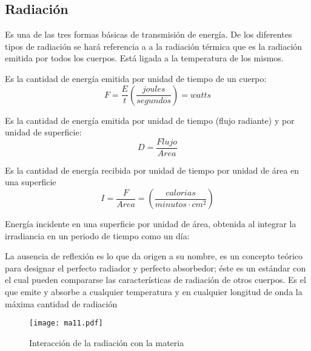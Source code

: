 \subsection{Radiación}
\begin{definition}
    Es una de las tres formas básicas de transmisión de energía. De los diferentes tipos de radiación se hará referencia a a la radiación térmica que es la radiación emitida por todos los cuerpos. Está ligada a la temperatura de los mismos.
\end{definition}
\begin{definition}
    Es la cantidad de energía emitida por unidad de tiempo de un cuerpo:
    \begin{equation}
        F = \frac{E}{t}\left(\frac{joules}{segundos}\right) = watts
    \end{equation}
\end{definition}
\begin{definition}
    Es la cantidad de energía emitida por unidad de tiempo (flujo radiante) y por unidad de superficie:
    \begin{equation}
        D = \frac{Flujo}{Area}
    \end{equation}
\end{definition}
\begin{definition}[Irradiancia]
    Es la cantidad de energía recibida por unidad de tiempo por unidad de área en una superficie
    \begin{equation}
        I=\frac{F}{Area} =\left(\frac{calorias}{minutos\cdot cm^2}\right)
    \end{equation}
\end{definition}
\begin{definition}[Irradiación]
    Energía incidente en una superficie por unidad de área, obtenida al integrar la irradiancia en un periodo de tiempo como un día:
\end{definition}
\begin{definition}
    La ausencia de reflexión es lo que da origen a su nombre, es un concepto teórico para designar el perfecto radiador y perfecto absorbedor; éste es un estándar con el cual pueden compararse las características de radiación de otros cuerpos. Es el que emite y absorbe a cualquier temperatura y en cualquier longitud de onda la máxima cantidad de radiación
\end{definition}
\begin{figure}[h!]
\centering
  \texttt{[image: ma11.pdf]}
  \caption{Interacción de la radiación con la materia}
  \label{ma11}
\end{figure}
